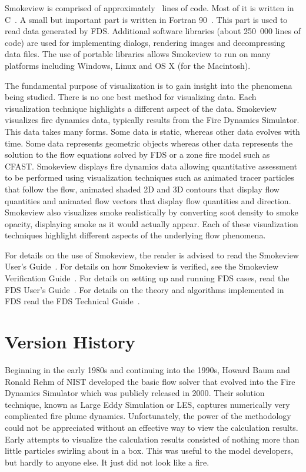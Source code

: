 \documentclass[11pt,twoside]{book}
\begin{document}
Smokeview is comprised of approximately \smvlines\ lines of code.
Most of it is written in C~\cite{C:book}. A small but important
part is written in Fortran 90~\cite{Fortran:book}.  This part is
used to read data generated by FDS.  Additional software libraries
(about 250~000 lines of code) are used for implementing dialogs,
rendering images and decompressing data files. The use of portable
libraries allows Smokeview to run on many platforms including
Windows, Linux and OS X (for the Macintosh).

The fundamental purpose of visualization is to gain insight into
the phenomena being studied. There is no one best method for
visualizing data. Each visualization technique highlights a
different aspect of the data. Smokeview visualizes fire dynamics
data, typically results from the Fire Dynamics Simulator. This
data takes many forms.  Some data is static, whereas other data
evolves with time. Some data represents geometric objects whereas
other data represents the solution to the flow equations solved by
FDS or a zone fire model such as CFAST. Smokeview displays fire
dynamics data allowing quantitative assessment to be performed
using visualization techniques such as animated tracer particles
that follow the flow, animated shaded 2D and 3D contours that
display flow quantities and animated flow vectors that display
flow quantities and direction. Smokeview also visualizes smoke
realistically by converting soot density to smoke opacity,
displaying smoke as it would actually appear. Each of these
visualization techniques highlight different aspects of the
underlying flow phenomena.

For details on the use of Smokeview, the reader is advised to read
the Smokeview User's Guide~\cite{Smokeview_Users_Guide}. For
details on how Smokeview is verified, see the Smokeview
Verification Guide~\cite{Smokeview_Verification_Guide}.  For
details on setting up and running FDS cases, read the FDS User's
Guide~\cite{FDS_Users_Guide}.  For details on the theory and
algorithms implemented in FDS read the FDS Technical
Guide~\cite{FDS_Tech_Guide}.

%
%

\section{Version History}

Beginning in the early 1980s and continuing into the 1990s, Howard
Baum and Ronald Rehm of NIST developed the basic flow solver that
evolved into the Fire Dynamics Simulator which was publicly
released in 2000\cite{FDS_Users_Guide}.  Their solution technique,
known as Large Eddy Simulation or LES, captures numerically very
complicated fire plume dynamics.  Unfortunately, the power of the
methodology could not be appreciated without an effective way to
view the calculation results.  Early attempts to visualize the
calculation results consisted of nothing more than little
particles swirling about in a box.  This was useful to the model
developers, but hardly to anyone else.  It just did not look like
a fire.
\end{document}
